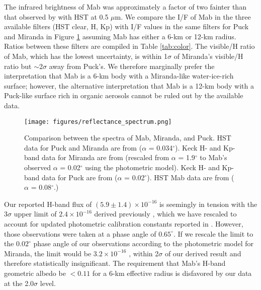 \documentclass[preprint]{aastex631}
\begin{document}
The infrared brightness of Mab was approximately a factor of two fainter than that observed by \citet{showalter06} with HST at 0.5 $\mu$m. We compare the I/F of Mab in the three available filters (HST clear, H, Kp) with I/F values in the same filters for Puck and Miranda \citep{karkoschka01, gibbard05, paradis23} in Figure \ref{fig:spectrum} assuming Mab has either a 6-km or 12-km radius. Ratios between these filters are compiled in Table \ref{tab:color}. The visible/H ratio of Mab, which has the lowest uncertainty, is within 1$\sigma$ of Miranda's visible/H ratio but $\sim$2$\sigma$ away from Puck's. We therefore marginally prefer the interpretation that Mab is a 6-km body with a Miranda-like water-ice-rich surface; however, the alternative interpretation that Mab is a 12-km body with a Puck-like surface rich in organic aerosols cannot be ruled out by the available data.




\begin{figure}
\texttt{[image: figures/reflectance\_spectrum.png]}
\caption{Comparison between the spectra of Mab, Miranda, and Puck. HST data for Puck and Miranda are from \citet{karkoschka01} ($\alpha$ = 0.034$^\circ$). Keck H- and Kp-band data for Miranda are from \citet{gibbard05} (rescaled from $\alpha$ = 1.9$^\circ$ to Mab's observed $\alpha$ = 0.02$^\circ$ using the \citet{karkoschka01} photometric model). Keck H- and Kp-band data for Puck are from \citet{paradis23} ($\alpha$ = 0.02$^\circ$). HST Mab data are from \citet{showalter06} ($\alpha$ = 0.08$^\circ$.)}
\label{fig:spectrum}
\end{figure}

Our reported H-band flux of $(5.9 \pm 1.4)\times10^{-16}$ \ergsec{} is seemingly in tension with the 3$\sigma$ upper limit of $2.4 \times 10^{-16}$ \ergsec{} derived previously \citep[][]{paradis19}, which we have rescaled to account for updated photometric calibration constants reported in \citet{paradis23}. However, those observations were taken at a phase angle of $0.65^\circ$. If we rescale the limit to the $0.02^\circ$ phase angle of our observations according to the \citet{karkoschka01} photometric model for Miranda, the limit would be $3.2 \times 10^{-16}$ \ergsec{}, within 2$\sigma$ of our derived result and therefore statistically insignificant. The \citet{paradis23} requirement that Mab's H-band geometric albedo be $<0.11$ for a 6-km effective radius is disfavored by our data at the 2.0$\sigma$ level.
\end{document}
